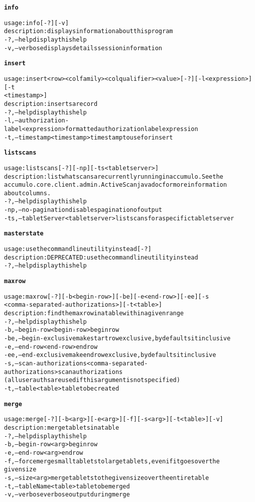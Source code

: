 \begin{alltt}
\textbf{info}

    usage: info [-?] [-v]
    description: displays information about this program
      -?,--help  display this help
      -v,--verbose	displays details session information

\textbf{insert}

    usage: insert <row> <colfamily> <colqualifier> <value> [-?] [-l <expression>] [-t
    	      <timestamp>]
    description: inserts a record
      -?,--help  display this help
      -l,--authorization-label <expression>  formatted authorization label expression
      -t,--timestamp <timestamp>  timestamp to use for insert

\textbf{listscans}

    usage: listscans [-?] [-np] [-ts <tablet server>]
    description: list what scans are currently running in accumulo. See the
    	      accumulo.core.client.admin.ActiveScan javadoc for more information
    	      about columns.
      -?,--help  display this help
      -np,--no-pagination  disables pagination of output
      -ts,--tabletServer <tablet server>  list scans for a specific tablet server

\textbf{masterstate}

    usage: use the command line utility instead [-?]
    description: DEPRECATED: use the command line utility instead
      -?,--help  display this help

\textbf{maxrow}

    usage: maxrow [-?] [-b <begin-row>] [-be] [-e <end-row>] [-ee] [-s
    	      <comma-separated-authorizations>] [-t <table>]
    description: find the max row in a table within a given range
      -?,--help  display this help
      -b,--begin-row <begin-row>  begin row
      -be,--begin-exclusive  make start row exclusive, by defaults it inclusive
      -e,--end-row <end-row>  end row
      -ee,--end-exclusive  make end row exclusive, by defaults it inclusive
      -s,--scan-authorizations <comma-separated-authorizations>  scan authorizations
    	      (all user auths are used if this argument is not specified)
      -t,--table <table>  table to be created

\textbf{merge}

    usage: merge [-?] [-b <arg>] [-e <arg>] [-f] [-s <arg>] [-t <table>] [-v]
    description: merge tablets in a table
      -?,--help  display this help
      -b,--begin-row <arg>	begin row
      -e,--end-row <arg>  end row
      -f,--force  merge small tablets to large tablets, even if it goes over the
    	      given size
      -s,--size <arg>  merge tablets to the given size over the entire table
      -t,--tableName <table>  table to be merged
      -v,--verbose	verbose output during merge


\end{alltt}
